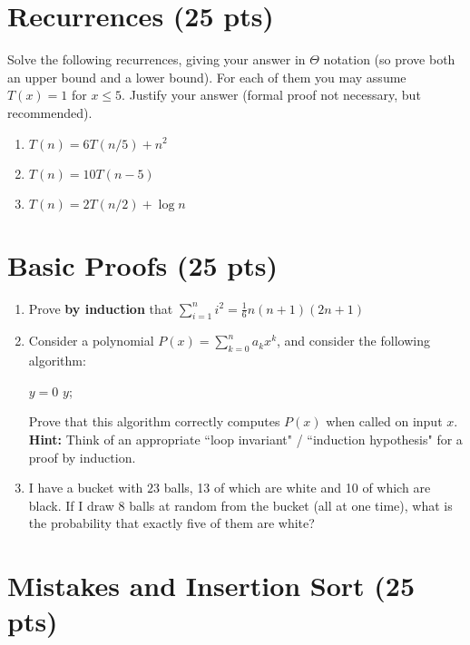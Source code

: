 \documentclass[11pt]{article}
\begin{document}
\section{Recurrences (25 pts)}

Solve the following recurrences, giving your answer in $\Theta$ notation (so prove both an upper bound and a lower bound).  For each of them you may assume $T(x) = 1$ for $x \leq 5$.   Justify your answer (formal proof not necessary, but recommended).

\begin{enumerate}

\item $T(n) = 6 T(n/5) + n^2$

\item $T(n) = 10 T(n-5)$

\item $T(n) = 2 T(n/2) + \log n$

\end{enumerate}


\section{Basic Proofs (25 pts)}
\begin{enumerate}

\item Prove \textbf{by induction} that $\sum_{i=1}^n i^2 = \frac16 n (n+1)(2n+1)$ 

\item Consider a polynomial $P(x) = \sum_{k=0}^n a_k x^k$, and consider the following algorithm:

\begin{algorithm}[H]
$y = 0$\;
\Return $y$;
\end{algorithm}
Prove that this algorithm correctly computes $P(x)$ when called on input $x$.\\
\textbf{Hint:} Think of an appropriate ``loop invariant" / ``induction hypothesis" for a proof by induction.

\item I have a bucket with $23$ balls, 13 of which are white and 10 of which are black.  If I draw $8$ balls at random from the bucket (all at one time), what is the probability that exactly five of them are white?

\end{enumerate}


\section{Mistakes and Insertion Sort (25 pts)}
\end{document}
